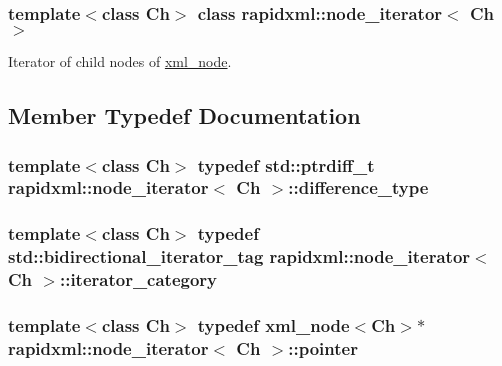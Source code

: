\subsubsection*{template$<$class Ch$>$ class rapidxml::node\_\-iterator$<$ Ch $>$}

Iterator of child nodes of \hyperlink{classrapidxml_1_1xml__node}{xml\_\-node}. 

\subsection{Member Typedef Documentation}
\hypertarget{classrapidxml_1_1node__iterator_a5bdc462b980a52c5fa2d99ac9f4f4bff}{
\subsubsection[{difference\_\-type}]{\setlength{\rightskip}{0pt plus 5cm}template$<$class Ch$>$ typedef std::ptrdiff\_\-t {\bf rapidxml::node\_\-iterator}$<$ Ch $>$::{\bf difference\_\-type}}}
\label{d6/df3/classrapidxml_1_1node__iterator_a5bdc462b980a52c5fa2d99ac9f4f4bff}
\hypertarget{classrapidxml_1_1node__iterator_a8e82d75f768e17bf7349d010ee26c037}{
\subsubsection[{iterator\_\-category}]{\setlength{\rightskip}{0pt plus 5cm}template$<$class Ch$>$ typedef std::bidirectional\_\-iterator\_\-tag {\bf rapidxml::node\_\-iterator}$<$ Ch $>$::{\bf iterator\_\-category}}}
\label{d6/df3/classrapidxml_1_1node__iterator_a8e82d75f768e17bf7349d010ee26c037}
\hypertarget{classrapidxml_1_1node__iterator_a65dca8bca2b9c29f635b9ad0bdeeecb9}{
\subsubsection[{pointer}]{\setlength{\rightskip}{0pt plus 5cm}template$<$class Ch$>$ typedef {\bf xml\_\-node}$<$Ch$>$$\ast$ {\bf rapidxml::node\_\-iterator}$<$ Ch $>$::{\bf pointer}}}
